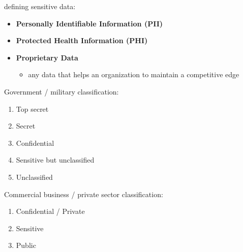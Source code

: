 \documentclass[11pt,twoside,landscape]{article}
\begin{document}
\begin{multicols}{4}
defining sensitive data:
\begin{itemize}
\item \textbf{Personally Identifiable Information (PII)}
\item \textbf{Protected Health Information (PHI)}
\item \textbf{Proprietary Data}
\begin{itemize}
\item any data that helps an organization to maintain a competitive edge
\end{itemize}
\end{itemize}

Government / military classification:
\begin{enumerate}
\item Top secret
\item Secret
\item Confidential
\item Sensitive but unclassified
\item Unclassified
\end{enumerate}

Commercial business / private sector classification:
\begin{enumerate}
\item Confidential / Private
\item Sensitive
\item Public
\end{enumerate}


\end{multicols}
\end{document}
